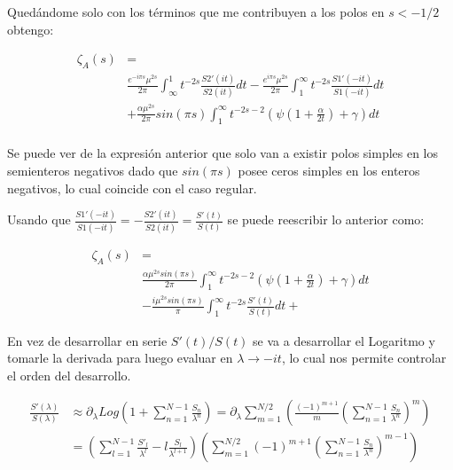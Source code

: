 Quedándome solo con los términos que me contribuyen a los polos en  $s < -1/2$ obtengo:

\begin{equation}
\begin{aligned}
 \zeta _A (s) &= \\[10pt]
& \frac{e ^{- i \pi s} \mu ^{2s } }{2 \pi}
\int _{\infty} ^{1} t ^{-2s } 
		\frac{S2' (it)}{S2 (it)}
		d t
	- 
\frac{e ^{i \pi s} \mu ^{2s}}{2 \pi}
\int _{1} ^{\infty} t ^{-2s } 
	\frac{S1' (-it)}{S1(-it)}
	d t 
	 \\[10pt]
	& + \frac{\alpha \mu ^{2s} }{2 \pi }	sin( \pi s)  \int _1 ^{\infty}
	t ^{-2s-2} \left( \psi \left( 1 + \frac{\alpha}{2 t}\right) + \gamma \right) dt \\[15pt]
\end{aligned}
\end{equation}




Se puede ver de la expresión anterior que solo van a existir polos simples en los semienteros negativos dado que $sin(\pi s)$ posee ceros simples en los enteros negativos, lo cual coincide con el caso regular.

Usando que $\frac{S1' (-it)}{S1 (-i t)} = - \frac{S2 ' (i t)}{S2(it)} = \frac{S'(t)}{S(t)}  $ se puede reescribir lo anterior como:

\begin{equation}
\begin{aligned}
\zeta _A (s) &=  \\[5pt]
&
\frac{\alpha \mu ^{2s} sin( \pi s )}{2 \pi } \int _{1} ^{\infty} 
t ^{-2s-2} \left( \psi (1 + \frac{\alpha}{2 t}) + \gamma \right) dt \\[5pt]
& -  \frac{i \mu ^{2s}  sin (\pi s)}{\pi} \int _1 ^{\infty} t ^{-2s} \frac{S'(t)}{S(t)} dt + 
\end{aligned}
\end{equation}



En vez de desarrollar en serie $S'(t) / S (t)$ se va a desarrollar el Logaritmo y tomarle la derivada para luego evaluar en $\lambda \rightarrow -i t$, lo cual nos permite controlar el orden del desarrollo.

\begin{equation}
\begin{aligned}
\frac{S'( \lambda)}{S( \lambda )} &\approx 
\partial _{\lambda} Log \left(
								1 + \sum _{n=1} ^{N-1}  \frac{S _n}{\lambda ^n}
								\right) =
\partial _{\lambda} 
\sum _{m = 1} ^{N/2} 
	\left(
	\frac{(-1) ^{m+1} }{m}
	\left(
		\sum _{n=1} ^{N-1} \frac{S _n}{\lambda ^n}
		\right) ^m 
	\right)  \\[10pt]
	&=
\left(								
	\sum _{l = 1} ^{N-1} 
	\frac{S' _l}{\lambda ^l} - l \frac{S _l}{\lambda ^{l+1}}
	\right)							
\left(
	\sum _{m = 1} ^{N/2} (-1) ^{m+1} 
	\left(
			\sum _{n=1} ^{N-1} \frac{S _n}{\lambda ^n}
			\right) ^{m-1}		
	\right)
\end{aligned}	
\end{equation}



